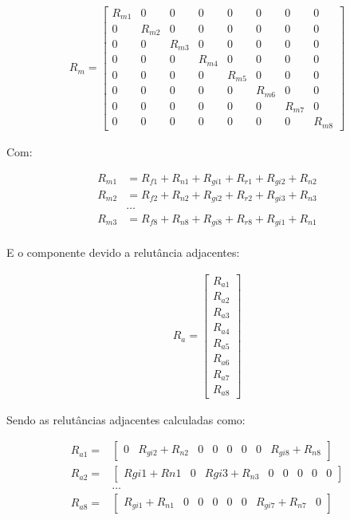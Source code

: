  \begin{align}
  R_m  = 
	\begin{bmatrix}
			 R_{m1} & 0 & 0 & 0 & 0 & 0 & 0 & 0 \\
			 0 & R_{m2} & 0 & 0 & 0 & 0 & 0 & 0 \\
			 0 & 0 & R_{m3} & 0 & 0 & 0 & 0 & 0 \\
			 0 & 0 & 0 & R_{m4} & 0 & 0 & 0 & 0 \\
			 0 & 0 & 0 & 0 & R_{m5} & 0 & 0 & 0 \\
			 0 & 0 & 0 & 0 & 0 & R_{m6} & 0 & 0 \\
			 0 & 0 & 0 & 0 & 0 & 0 & R_{m7} & 0  \\
 			 0 & 0 & 0 & 0 & 0 & 0 & 0 & R_{m8} 
	\end{bmatrix}
 \end{align}
 
Com:
 
 \begin{align}
	 R_{m1} &= R_{f1} + R_{n1} + R_{gi1} + R_{r1} + R_{gi2} + R_{n2} \\
	 R_{m2} &= R_{f2} + R_{n2} + R_{gi2} + R_{r2} + R_{gi3} + R_{n3}  \\
	 & \ldots \\
 	 R_{m3} &= R_{f8} + R_{n8} + R_{gi8} + R_{r8} + R_{gi1} + R_{n1}  \\
 \end{align}

E o componente devido a relutância adjacentes:

\begin{align}
R_a =
	\begin{bmatrix}
		R_{a1} \\ 	R_{a2} \\ 	R_{a3} \\ 	R_{a4} \\ 
		R_{a5} \\ 	R_{a6} \\ 	R_{a7} \\ 	R_{a8} 
	\end{bmatrix}
\end{align}

Sendo as relutâncias adjacentes calculadas como:

 \begin{align}
	 R_{a1} =& 
	 \begin{bmatrix}
			0 & R_{gi2} + R_{n2} & 0 & 0 & 0 & 0 & 0 & R_{gi8}+R_{n8}
	 \end{bmatrix} \\
	 R_{a2} =&
	 \begin{bmatrix}
		R{gi1}+R{n1} & 0 & R{gi3}+R_{n3} & 0 & 0 & 0 & 0 & 0
	 \end{bmatrix} \\
	 & \ldots \\
	 R_{a8} =&
	 \begin{bmatrix}
		R_{gi1}+R_{n1} & 0 & 0 & 0 & 0  &0 & R_{gi7}+R_{n7} & 0 
	 \end{bmatrix} 
 \end{align}

